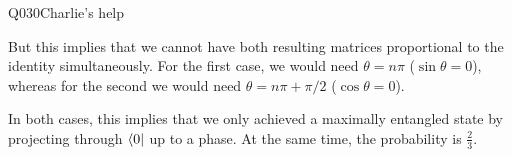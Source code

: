 \begin{entry}{Q030}{Charlie's help}
\begin{solution}[b)]
But this implies that we cannot have both resulting matrices proportional to the identity simultaneously. For the first case, we would need $\theta = n\pi$ ($\sin{\theta}=0$), whereas for the second we would need $\theta = n\pi +\pi/2$ ($\cos{\theta}=0$). 

In both cases, this implies that we only achieved a maximally entangled state by projecting through $\langle 0 \rvert$ up to a phase. At the same time, the probability is $\frac{2}{3}$. 


\end{solution}


\begin{takeaway}
\end{takeaway}


\end{entry}
